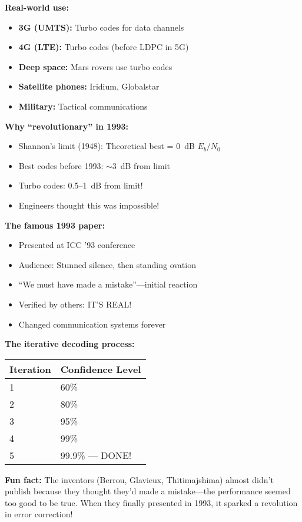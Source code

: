 \begin{nontechnical}
\textbf{Real-world use:}
\begin{itemize}
\item \textbf{3G (UMTS):} Turbo codes for data channels
\item \textbf{4G (LTE):} Turbo codes (before LDPC in 5G)
\item \textbf{Deep space:} Mars rovers use turbo codes
\item \textbf{Satellite phones:} Iridium, Globalstar
\item \textbf{Military:} Tactical communications
\end{itemize}

\textbf{Why ``revolutionary'' in 1993:}
\begin{itemize}
\item Shannon's limit (1948): Theoretical best = 0~dB $E_b/N_0$
\item Best codes before 1993: $\sim$3~dB from limit
\item Turbo codes: 0.5--1~dB from limit!
\item Engineers thought this was impossible!
\end{itemize}

\textbf{The famous 1993 paper:}
\begin{itemize}
\item Presented at ICC '93 conference
\item Audience: Stunned silence, then standing ovation
\item ``We must have made a mistake''---initial reaction
\item Verified by others: IT'S REAL!
\item Changed communication systems forever
\end{itemize}

\textbf{The iterative decoding process:}
\begin{center}
\begin{tabular}{@{}ll@{}}
\toprule
Iteration & Confidence Level \\
\midrule
1 & 60\% \\
2 & 80\% \\
3 & 95\% \\
4 & 99\% \\
5 & 99.9\% --- DONE! \\
\bottomrule
\end{tabular}
\end{center}

\textbf{Fun fact:} The inventors (Berrou, Glavieux, Thitimajshima) almost didn't publish because they thought they'd made a mistake---the performance seemed too good to be true. When they finally presented in 1993, it sparked a revolution in error correction!
\end{nontechnical}

